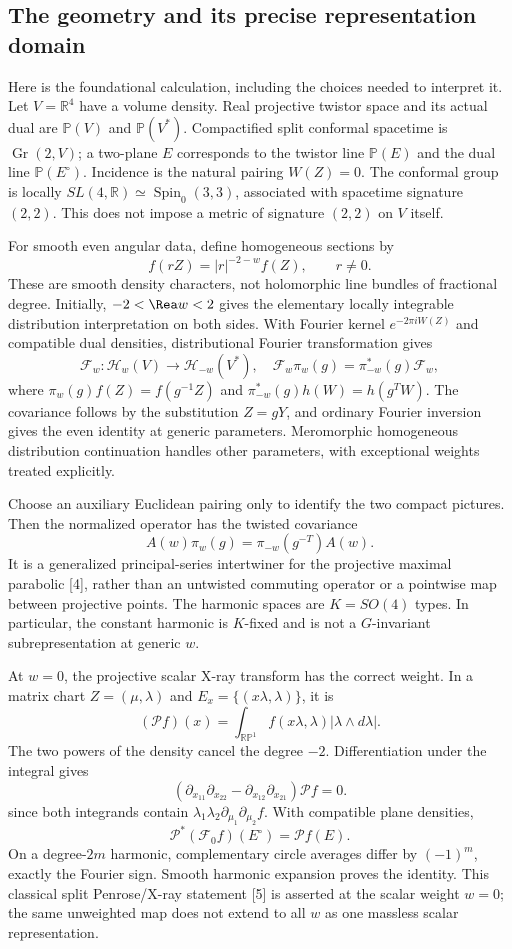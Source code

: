 \subsection*{The geometry and its precise representation domain}
Here is the foundational calculation, including the choices needed to interpret it. Let $V=\mathbb R^4$ have a volume density. Real projective twistor space and its actual dual are $\mathbb P(V)$ and $\mathbb P(V^*)$. Compactified split conformal spacetime is $\operatorname{Gr}(2,V)$; a two-plane $E$ corresponds to the twistor line $\mathbb P(E)$ and the dual line $\mathbb P(E^\circ)$. Incidence is the natural pairing $W(Z)=0$. The conformal group is locally $SL(4,\mathbb R)\simeq\operatorname{Spin}_0(3,3)$, associated with spacetime signature $(2,2)$. This does not impose a metric of signature $(2,2)$ on $V$ itself.

For smooth even angular data, define homogeneous sections by
\[
 f(rZ)=|r|^{-2-w}f(Z),\qquad r\ne0.
\]
These are smooth density characters, not holomorphic line bundles of fractional degree. Initially, $-2<\Rea w<2$ gives the elementary locally integrable distribution interpretation on both sides. With Fourier kernel $e^{-2\pi iW(Z)}$ and compatible dual densities, distributional Fourier transformation gives
\[
 \mathcal F_w:\mathcal H_w(V)\longrightarrow\mathcal H_{-w}(V^*),\quad
 \mathcal F_w\pi_w(g)=\pi^*_{-w}(g)\mathcal F_w,
\]
where $\pi_w(g)f(Z)=f(g^{-1}Z)$ and $\pi^*_{-w}(g)h(W)=h(g^TW)$. The covariance follows by the substitution $Z=gY$, and ordinary Fourier inversion gives the even identity at generic parameters. Meromorphic homogeneous distribution continuation handles other parameters, with exceptional weights treated explicitly.

Choose an auxiliary Euclidean pairing only to identify the two compact pictures. Then the normalized operator has the twisted covariance
\[
 A(w)\pi_w(g)=\pi_{-w}(g^{-T})A(w).
\]
It is a generalized principal-series intertwiner for the projective maximal parabolic [4], rather than an untwisted commuting operator or a pointwise map between projective points. The harmonic spaces are $K=SO(4)$ types. In particular, the constant harmonic is $K$-fixed and is not a $G$-invariant subrepresentation at generic $w$.

At $w=0$, the projective scalar X-ray transform has the correct weight. In a matrix chart $Z=(\mu,\lambda)$ and $E_x=\{(x\lambda,\lambda)\}$, it is
\[
 (\mathcal Pf)(x)=\int_{\mathbb{RP}^1}f(x\lambda,\lambda)|\lambda\wedge d\lambda|.
\]
The two powers of the density cancel the degree $-2$. Differentiation under the integral gives
\[
 (\partial_{x_{11}}\partial_{x_{22}}-\partial_{x_{12}}\partial_{x_{21}})\mathcal Pf=0.
\]
since both integrands contain $\lambda_1\lambda_2\partial_{\mu_1}\partial_{\mu_2}f$. With compatible plane densities,
\[
 \mathcal P^*(\mathcal F_0f)(E^\circ)=\mathcal Pf(E).
\]
On a degree-$2m$ harmonic, complementary circle averages differ by $(-1)^m$, exactly the Fourier sign. Smooth harmonic expansion proves the identity. This classical split Penrose/X-ray statement [5] is asserted at the scalar weight $w=0$; the same unweighted map does not extend to all $w$ as one massless scalar representation.

